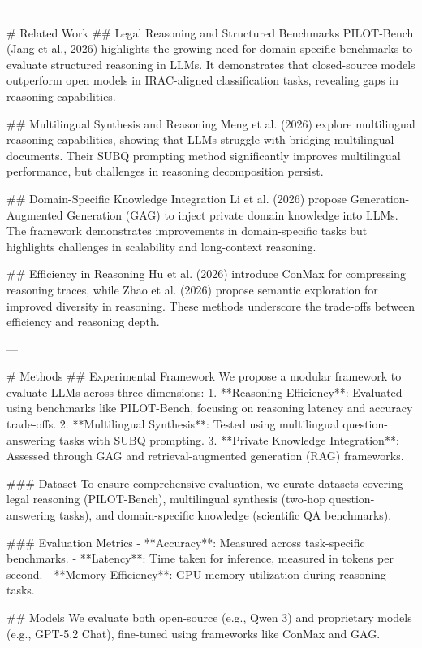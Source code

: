 ---

# Related Work  
## Legal Reasoning and Structured Benchmarks  
PILOT-Bench (Jang et al., 2026) highlights the growing need for domain-specific benchmarks to evaluate structured reasoning in LLMs. It demonstrates that closed-source models outperform open models in IRAC-aligned classification tasks, revealing gaps in reasoning capabilities.  

## Multilingual Synthesis and Reasoning  
Meng et al. (2026) explore multilingual reasoning capabilities, showing that LLMs struggle with bridging multilingual documents. Their SUBQ prompting method significantly improves multilingual performance, but challenges in reasoning decomposition persist.  

## Domain-Specific Knowledge Integration  
Li et al. (2026) propose Generation-Augmented Generation (GAG) to inject private domain knowledge into LLMs. The framework demonstrates improvements in domain-specific tasks but highlights challenges in scalability and long-context reasoning.  

## Efficiency in Reasoning  
Hu et al. (2026) introduce ConMax for compressing reasoning traces, while Zhao et al. (2026) propose semantic exploration for improved diversity in reasoning. These methods underscore the trade-offs between efficiency and reasoning depth.  

---

# Methods  
## Experimental Framework  
We propose a modular framework to evaluate LLMs across three dimensions:  
1. **Reasoning Efficiency**: Evaluated using benchmarks like PILOT-Bench, focusing on reasoning latency and accuracy trade-offs.  
2. **Multilingual Synthesis**: Tested using multilingual question-answering tasks with SUBQ prompting.  
3. **Private Knowledge Integration**: Assessed through GAG and retrieval-augmented generation (RAG) frameworks.  

### Dataset  
To ensure comprehensive evaluation, we curate datasets covering legal reasoning (PILOT-Bench), multilingual synthesis (two-hop question-answering tasks), and domain-specific knowledge (scientific QA benchmarks).  

### Evaluation Metrics  
- **Accuracy**: Measured across task-specific benchmarks.  
- **Latency**: Time taken for inference, measured in tokens per second.  
- **Memory Efficiency**: GPU memory utilization during reasoning tasks.  

## Models  
We evaluate both open-source (e.g., Qwen 3) and proprietary models (e.g., GPT-5.2 Chat), fine-tuned using frameworks like ConMax and GAG.  

